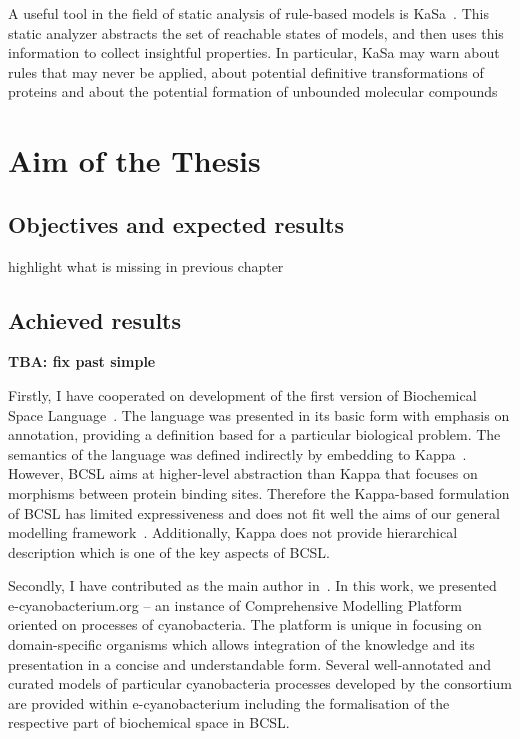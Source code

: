 \documentclass[11pt,a4paper]{report}
\begin{document}
A useful tool in the field of static analysis of rule-based models is KaSa~\cite{boutillier2018kasa}. This static analyzer abstracts the set of reachable states of models, and then uses this information to collect insightful properties. In particular, KaSa may warn about rules that may never be applied, about potential definitive transformations of proteins and about the potential formation of unbounded molecular compounds

\chapter{Aim of the Thesis} \label{chap:aim}

\section{Objectives and expected results}

highlight what is missing in previous chapter

\section{Achieved results}

\textbf{TBA: fix past simple}

Firstly, I have cooperated on development of the first version of Biochemical Space Language~\cite{Ded201627}. The language was presented in its basic form with emphasis on annotation, providing a definition based for a particular biological problem. The semantics of the language was defined indirectly by embedding to Kappa~\cite{kappa_formal}. However, BCSL aims at higher-level abstraction than Kappa that focuses on morphisms between protein binding sites. Therefore the Kappa-based formulation of BCSL has limited expressiveness and does not fit well the aims of our general modelling framework~\cite{cs2bio2013}. Additionally, Kappa does not provide hierarchical description which is one of the key aspects of BCSL.

Secondly, I have contributed as the main author in~\cite{Trojak2016}. In this work, we presented e-cyanobacterium.org -- an instance of Comprehensive Modelling Platform oriented on processes of cyanobacteria. The platform is unique in focusing on domain-specific organisms which allows integration of the knowledge and its presentation in a concise and understandable form. Several well-annotated and curated models of particular cyanobacteria processes developed by the consortium are provided within e-cyanobacterium including the formalisation of the respective part of biochemical space in BCSL.
\end{document}

